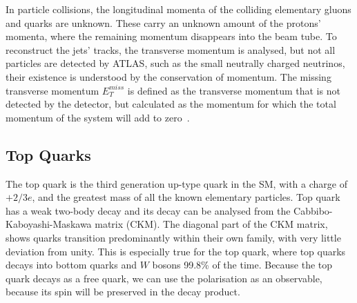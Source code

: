 \documentclass[12pt,a4paper]{article}
\numberwithin{equation}{section}
\begin{document}
In particle collisions, the longitudinal momenta of the colliding elementary
gluons and quarks are unknown. These carry an unknown amount of the protons'
momenta, where the remaining momentum disappears into the beam tube. To
reconstruct the jets' tracks, the transverse momentum is analysed, but not all
particles are detected by ATLAS, such as the small neutrally charged neutrinos,
their existence is understood by the conservation of momentum. The missing
transverse momentum $E_T^{miss}$ is defined as the transverse momentum that is
not detected by the detector, but calculated as the momentum for which the total
momentum of the system will add to zero~\cite{xabier}.

\subsection{Top Quarks}
The top quark is the third generation up-type quark in the SM, with a charge of
$+2/3 e$, and the greatest mass of all the known elementary particles. Top quark
has a weak two-body decay and its decay can be analysed from the
Cabbibo-Kaboyashi-Maskawa matrix (CKM). The diagonal part of the CKM matrix,
shows quarks transition predominantly within their own family, with very little
deviation from unity. This is especially true for the top quark, where top
quarks decays into bottom quarks and $W$ bosons 99.8\% of the time. Because the
top quark decays as a free quark, we can use the polarisation as an observable,
because its spin will be preserved in the decay product.\\
\end{document}
